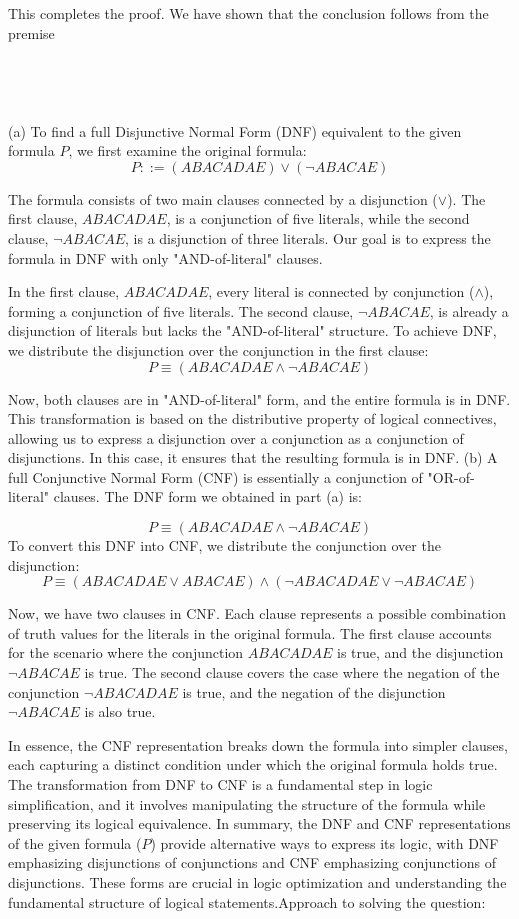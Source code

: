 \documentclass{article}
\begin{document}
This completes the proof. We have shown that the conclusion follows from the premise\\
\\
\\
\\
\\




(a) To find a full Disjunctive Normal Form (DNF) equivalent to the given formula \(P\), we first examine the original formula:
\[ P ::= (ABACADAE) \lor (\lnot ABACAE) \]
 
The formula consists of two main clauses connected by a disjunction (\(\lor\)). The first clause, \(ABACADAE\), is a conjunction of five literals, while the second clause, \(\lnot ABACAE\), is a disjunction of three literals. Our goal is to express the formula in DNF with only "AND-of-literal" clauses.
 
In the first clause, \(ABACADAE\), every literal is connected by conjunction (\(\land\)), forming a conjunction of five literals. The second clause, \(\lnot ABACAE\), is already a disjunction of literals but lacks the "AND-of-literal" structure.
To achieve DNF, we distribute the disjunction over the conjunction in the first clause:
\[ P \equiv (ABACADAE \land \lnot ABACAE) \]
 
Now, both clauses are in "AND-of-literal" form, and the entire formula is in DNF.
This transformation is based on the distributive property of logical connectives, allowing us to express a disjunction over a conjunction as a conjunction of disjunctions. In this case, it ensures that the resulting formula is in DNF.
(b) A full Conjunctive Normal Form (CNF) is essentially a conjunction of "OR-of-literal" clauses. The DNF form we obtained in part (a) is:
 
\[ P \equiv (ABACADAE \land \lnot ABACAE) \]
To convert this DNF into CNF, we distribute the conjunction over the disjunction:
\[ P \equiv (ABACADAE \lor ABACAE) \land (\lnot ABACADAE \lor \lnot ABACAE) \]
 
Now, we have two clauses in CNF. Each clause represents a possible combination of truth values for the literals in the original formula. The first clause accounts for the scenario where the conjunction \(ABACADAE\) is true, and the disjunction \(\lnot ABACAE\) is true. The second clause covers the case where the negation of the conjunction \(\lnot ABACADAE\) is true, and the negation of the disjunction \(\lnot ABACAE\) is also true.
 
In essence, the CNF representation breaks down the formula into simpler clauses, each capturing a distinct condition under which the original formula holds true. The transformation from DNF to CNF is a fundamental step in logic simplification, and it involves manipulating the structure of the formula while preserving its logical equivalence.
In summary, the DNF and CNF representations of the given formula (\(P\)) provide alternative ways to express its logic, with DNF emphasizing disjunctions of conjunctions and CNF emphasizing conjunctions of disjunctions. These forms are crucial in logic optimization and understanding the fundamental structure of logical statements.Approach to solving the question:\\
\end{document}
